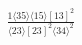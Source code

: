 \documentclass[varwidth, border=5pt]{standalone}
\begin{document}
\begin{my}
$\begin{gathered}
\scriptscriptstyle\frac{1⟨35⟩⟨15⟩[13]^2}{⟨23⟩[23]^2⟨34⟩^2}
\end{gathered}$
\end{my}
\end{document}
